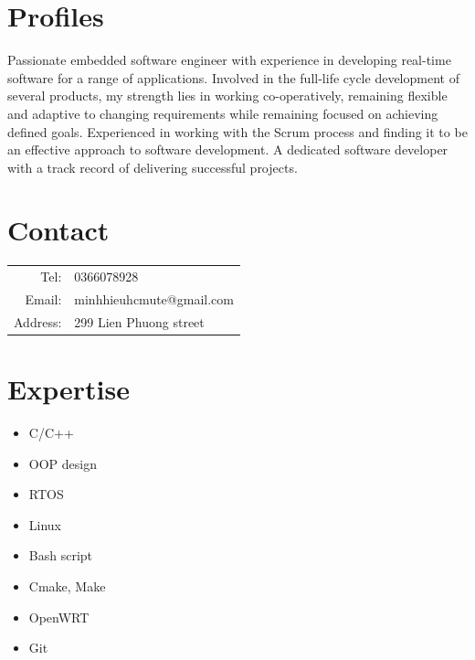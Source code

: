 \documentclass[10pt,oneside,a4paper]{article}
\begin{document}
\begin{tcolorbox}
    \begin{minipage}[t]{8cm}
        \vspace*{-0.5cm}
        \begin{tcolorbox}[grow to left by=0.6cm, colback=gray!25,colframe=white]
            \section*{Profiles}
            Passionate embedded software engineer with experience in developing real-time software for a
            range of applications. Involved in the full-life cycle development of several products, my strength
            lies in working co-operatively, remaining flexible and adaptive to changing requirements while remaining
            focused on achieving defined goals. Experienced in working with the Scrum process and finding it to 
            be an effective approach to software development. A dedicated software developer with a track record of
            delivering successful projects.
            
            \section*{Contact}
            \begin{tabular}{r l}
                Tel: & 0366078928 \\
                Email: & minhhieuhcmute@gmail.com \\
                Address: & 299 Lien Phuong street
            \end{tabular}
            
            \section*{Expertise}
            \begin{itemize}
                \item {C/C++}
                \item {OOP design}
                \item {RTOS}
                \item {Linux}
                \item {Bash script}
                \item {Cmake, Make}
                \item {OpenWRT}
                \item {Git}
            \end{itemize}
            

\end{tcolorbox}
\end{minipage}
\end{tcolorbox}
\end{document}
